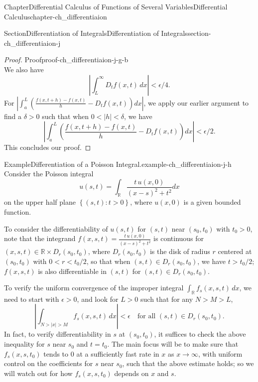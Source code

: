 \documentclass[oneside,10pt,]{book}
\numberwithin{equation}{section}
\begin{document}
\begin{chapterptx}{Chapter}{Differential Calculus of Functions of Several Variables}{}{Differential Calculus}{}{}{chapter-ch_differentiaion}
\begin{sectionptx}{Section}{Differentiation of Integrals}{}{Differentiation of Integrals}{}{}{section-ch_differentiaion-j}
\begin{proof}{Proof}{}{proof-ch_differentiaion-j-g-b}
\begin{equation*}
\end{equation*}
We also have%
\begin{equation*}
\left| \int_L^{\infty}   D_t f(x,t) \, dx \right| < \epsilon/4.
\end{equation*}
For \(\left| \int_a^{L}  \left(  \frac{f(x,t+h)-f(x,t)}{h} - D_t f(x,t) \right) dx \right|\), we apply our earlier argument to find a \(\delta >0\) such that when \(0 < |h| < \delta\), we have%
\begin{equation*}
\left| \int_a^{L}  \left(  \frac{f(x,t+h)-f(x,t)}{h} - D_t f(x,t) \right) dx \right| < \epsilon/2.
\end{equation*}
This concludes our proof.\end{proof}
\begin{example}{Example}{Differentiation of a Poisson Integral.}{example-ch_differentiaion-j-h}%
Consider the Poisson integral%
\begin{equation*}
u(s,t)=\int_{\mathbb R} \frac {t \, u(x,0)}{(x-s)^2 + t^2} dx
\end{equation*}
on  the upper half plane \(\left\{(s,t): t>0\right\}\), where \(u(x,0)\) is a given bounded function.%
\par
To consider the differentiability of \(u(s, t)\) for \((s,t)\) near \((s_0,t_0)\) with \(t_0>0\), note that the integrand \(f(x,s,t)=  \frac {t \, u(x,0)}{(x-s)^2 + t^2}\) is continuous for \((x,s,t) \in \mathbb R \times D_{r}(s_0,t_0)\), where \(D_{r}(s_0,t_0)\) is the disk of radius \(r\) centered at \((s_0,t_0)\) with \(0 < r < t_0/2\), so that when \((s,t)\in D_{r}(s_0,t_0)\), we have \(t>t_0/2\); \(f(x,s,t)\) is also differentiable in \((s,t)\) for \((s,t)\in D_{r}(s_0,t_0)\).%
\par
To verify the uniform convergence of the improper integral \(\int_{\mathbb R} f_s(x,s,t) \, dx\), we need to start with \(\epsilon >0\), and look for \(L>0\) such that for any \(N>M>L\),%
\begin{equation*}
\left| \int_{N>|x|>M} f_s(x,s,t) \, dx \right| < \epsilon\quad \text{for all  } (s,t)\in D_{r}(s_0,t_0).
\end{equation*}
In fact, to verify differentiability in \(s\) at \((s_0,t_0)\), it suffices to check the above inequality for \(s\) near \(s_0\) and \(t=t_0\). The main focus will be to make sure that \(f_s(x,s,t_0)\) tends to \(0\) at a sufficiently fast rate in \(x\) as \(x\to \infty\),  with uniform control on the coefficients for \(s\) near \(s_0\), such that the above estimate holds; so we will watch out for how \(f_s(x,s,t_0)\) depends on \(x\) and \(s\).%

\end{example}
\end{sectionptx}
\end{chapterptx}
\end{document}
